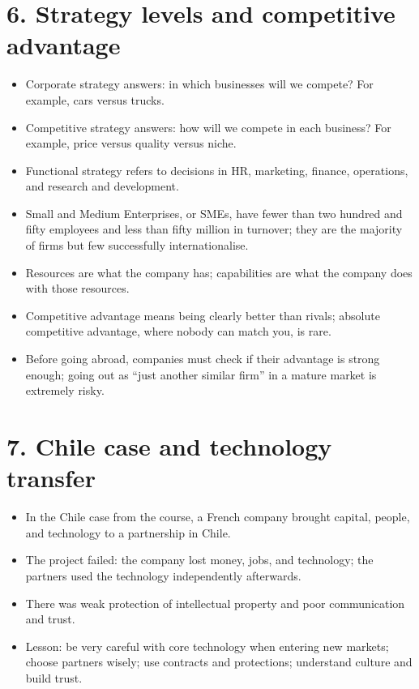 \documentclass[10pt,a4paper]{article}
\begin{document}
\section*{6. Strategy levels and competitive advantage}
\begin{itemize}
\item Corporate strategy answers: in which businesses will we compete? For example, cars versus trucks.
\item Competitive strategy answers: how will we compete in each business? For example, price versus quality versus niche.
\item Functional strategy refers to decisions in HR, marketing, finance, operations, and research and development.
\item Small and Medium Enterprises, or SMEs, have fewer than two hundred and fifty employees and less than fifty million in turnover; they are the majority of firms but few successfully internationalise.
\item Resources are what the company has; capabilities are what the company does with those resources.
\item Competitive advantage means being clearly better than rivals; absolute competitive advantage, where nobody can match you, is rare.
\item Before going abroad, companies must check if their advantage is strong enough; going out as “just another similar firm” in a mature market is extremely risky.
\end{itemize}

\section*{7. Chile case and technology transfer}
\begin{itemize}
\item In the Chile case from the course, a French company brought capital, people, and technology to a partnership in Chile.
\item The project failed: the company lost money, jobs, and technology; the partners used the technology independently afterwards.
\item There was weak protection of intellectual property and poor communication and trust.
\item Lesson: be very careful with core technology when entering new markets; choose partners wisely; use contracts and protections; understand culture and build trust.
\end{itemize}
\end{document}
